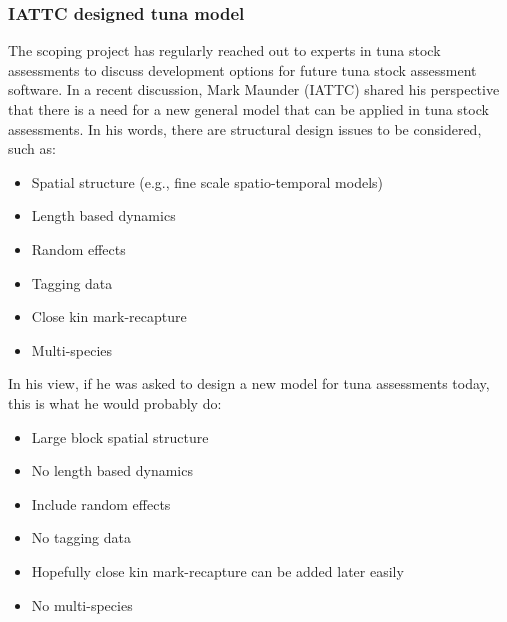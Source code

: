 \documentclass{SCreport}
\begin{document}
\newpage

\subsubsection{IATTC designed tuna model}
\label{sec:iattc-tuna-model}

The scoping project has regularly reached out to experts in tuna stock
assessments to discuss development options for future tuna stock assessment
software. In a recent discussion, Mark Maunder (IATTC) shared his perspective
that there is a need for a new general model that can be applied in tuna stock
assessments. In his words, there are structural design issues to be considered,
such as:

\begin{itemize}
  \item Spatial structure (e.g., fine scale spatio-temporal models)\\[-4.5ex]
  \item Length based dynamics\\[-4.5ex]
  \item Random effects\\[-4.5ex]
  \item Tagging data\\[-4.5ex]
  \item Close kin mark-recapture\\[-4.5ex]
  \item Multi-species
\end{itemize}

\vspace{2ex}

In his view, if he was asked to design a new model for tuna assessments today,
this is what he would probably do:

\begin{itemize}
  \item Large block spatial structure\\[-4.5ex]
  \item No length based dynamics\\[-4.5ex]
  \item Include random effects\\[-4.5ex]
  \item No tagging data\\[-4.5ex]
  \item Hopefully close kin mark-recapture can be added later easily\\[-4.5ex]
  \item No multi-species
\end{itemize}
\end{document}
